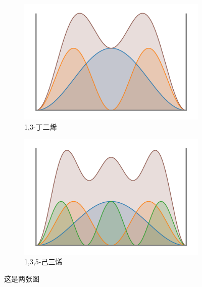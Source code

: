 \documentclass[11pt,a4paper,onecolumn]{article}
\begin{document}
\begin{figure}[H]
	\centering
	\begin{subfigure}[b]{0.45\textwidth}
		\centering
		\includegraphics[scale=0.45]{./fig/13-box.pdf}
		\caption{1,3-丁二烯}
	\end{subfigure}
	\begin{subfigure}[b]{0.45\textwidth}
		\centering
		\includegraphics[scale=0.45]{./fig/15-box.pdf}
		\caption{1,3,5-己三烯}
	\end{subfigure}
	\caption{这是两张图}
\end{figure}
\end{document}
